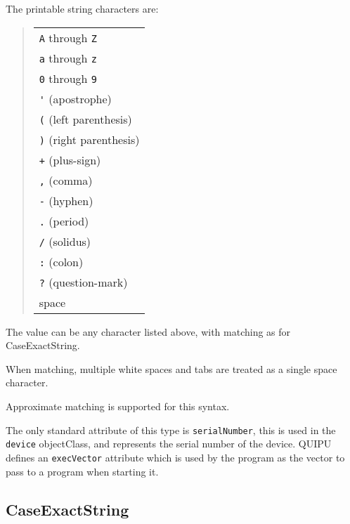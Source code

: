 The printable string characters are:
\begin{quote}\begin{tabular}{l}
\verb"A" through \verb"Z"\\
\verb"a" through \verb"z"\\
\verb"0" through \verb"9"\\
\verb"'" \hspace{2ex}(apostrophe)\\
\verb"(" \hspace{2ex}(left parenthesis)\\
\verb")" \hspace{2ex}(right parenthesis)\\
\verb"+" \hspace{2ex}(plus-sign)\\
\verb"," \hspace{2ex}(comma)\\
\verb"-" \hspace{2ex}(hyphen)\\
\verb"." \hspace{2ex}(period)\\
\verb"/" \hspace{2ex}(solidus)\\
\verb":" \hspace{2ex}(colon)\\
\verb"?" \hspace{2ex}(question-mark)\\
space
\end{tabular}\end{quote}

The value can be any character listed above, with matching as for
CaseExactString.

When matching, multiple white spaces and tabs are treated as a single space
character.

Approximate matching is supported for this syntax.

The only standard attribute of this type 
is \verb+serialNumber+, this is used in the
\verb+device+ objectClass, and represents the serial number of the
device.
QUIPU defines an \verb+execVector+ attribute which is used by the
 program as the vector to pass to a program when starting it.

\subsection{CaseExactString}


